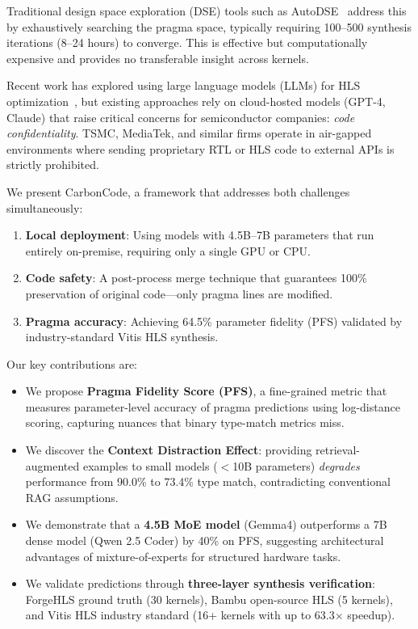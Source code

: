 \documentclass[conference]{IEEEtran}
\begin{document}
Traditional design space exploration (DSE) tools such as AutoDSE~\cite{autodse}
address this by exhaustively searching the pragma space, typically requiring
100--500 synthesis iterations (8--24 hours) to converge. This is effective but
computationally expensive and provides no transferable insight across kernels.

Recent work has explored using large language models (LLMs) for HLS
optimization~\cite{hlspilot}, but existing approaches rely on cloud-hosted models
(GPT-4, Claude) that raise critical concerns for semiconductor companies:
\emph{code confidentiality}. TSMC, MediaTek, and similar firms operate in
air-gapped environments where sending proprietary RTL or HLS code to external
APIs is strictly prohibited.

We present CarbonCode, a framework that addresses both challenges simultaneously:
\begin{enumerate}
    \item \textbf{Local deployment}: Using models with 4.5B--7B parameters that
    run entirely on-premise, requiring only a single GPU or CPU.
    \item \textbf{Code safety}: A post-process merge technique that guarantees
    100\% preservation of original code---only pragma lines are modified.
    \item \textbf{Pragma accuracy}: Achieving 64.5\% parameter fidelity (PFS)
    validated by industry-standard Vitis HLS synthesis.
\end{enumerate}

Our key contributions are:
\begin{itemize}
    \item We propose \textbf{Pragma Fidelity Score (PFS)}, a fine-grained metric
    that measures parameter-level accuracy of pragma predictions using log-distance
    scoring, capturing nuances that binary type-match metrics miss.

    \item We discover the \textbf{Context Distraction Effect}: providing
    retrieval-augmented examples to small models ($<$10B parameters)
    \emph{degrades} performance from 90.0\% to 73.4\% type match, contradicting
    conventional RAG assumptions.

    \item We demonstrate that a \textbf{4.5B MoE model} (Gemma4) outperforms a
    7B dense model (Qwen 2.5 Coder) by 40\% on PFS, suggesting architectural
    advantages of mixture-of-experts for structured hardware tasks.

    \item We validate predictions through \textbf{three-layer synthesis
    verification}: ForgeHLS ground truth (30 kernels), Bambu open-source HLS
    (5 kernels), and Vitis HLS industry standard (16+ kernels with up to
    63.3$\times$ speedup).
\end{itemize}
\end{document}

